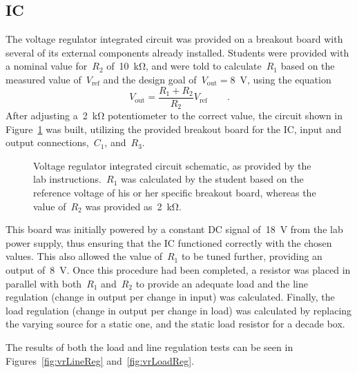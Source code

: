 \subsection{IC}
The voltage regulator integrated circuit was provided on a breakout board with
several of its external components already installed.  Students were provided
with a nominal value for~$R_2$ of~\SI{10}{\kilo\ohm}, and were told to
calculate~$R_1$ based on the measured value of~$V_\text{ref}$ and the design
goal of~$V_\text{out} = $\SI{8}{\volt}, using the equation
%
\begin{equation}
	V_\text{out} = \frac{R_1 + R_2}{R_2} V_\text{ref} \qquad \text{.}
	\label{eq:calcR1}
\end{equation}
%
After adjusting a~\SI{2}{\kilo\ohm} potentiometer to the correct value, the
circuit shown in Figure~\ref{fig:icSchem} was built, utilizing the provided
breakout board for the IC, input and output connections,~$C_1$, and~$R_3$.
%
\begin{figure}[H]
	\centering
	
	\parbox{.6\textwidth}{
	\caption[Schematic --- Voltage Regulator IC]{Voltage regulator integrated
	circuit schematic, as provided by the lab instructions.~$R_1$ was
	calculated by the student based on the reference voltage of his or her
	specific breakout board, whereas the value of~$R_2$ was provided
	as~\SI{2}{\kilo\ohm}.}
	\label{fig:icSchem}
	}
\end{figure}
%
This board was initially powered by a constant DC signal of~\SI{18}{\volt} from
the lab power supply, thus ensuring that the IC functioned correctly with the
chosen values.  This also allowed the value of~$R_1$ to be tuned further,
providing an output of~\SI{8}{\volt}.  Once this procedure had been completed,
a resistor was placed in parallel with both~$R_1$ and~$R_2$ to provide an
adequate load and the line regulation (change in output per change in input)
was calculated.  Finally, the load regulation (change in output per change in
load) was calculated by replacing the varying source for a static one, and the
static load resistor for a decade box.

The results of both the load and line regulation tests can be seen in
Figures~\ref{fig:vrLineReg} and~\ref{fig:vrLoadReg}.

